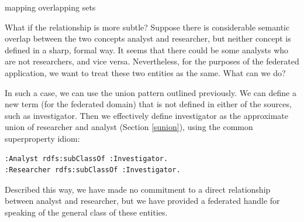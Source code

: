 \begin{challenge}{mapping overlapping sets}
\label{chal:6}

What if the relationship is more subtle? Suppose there is considerable
semantic overlap between the two concepts analyst and researcher, but
neither concept is defined in a sharp, formal way. It seems that there
could be some analysts who are not researchers, and vice versa.
Nevertheless, for the purposes of the federated application, we want to
treat these two entities as the same. What can we do?

\solution

In such a case, we can use the union pattern outlined previously. We can
define a new term (for the federated domain) that is not defined in
either of the sources, such as investigator. Then we effectively define
investigator as the approximate union of researcher and analyst (Section \ref{sunion}), using the common
superproperty idiom:

\begin{lstlisting}
:Analyst rdfs:subClassOf :Investigator.
:Researcher rdfs:subClassOf :Investigator.
\end{lstlisting}

Described this way, we have made no commitment to a direct relationship
between analyst and researcher, but we have provided a federated handle
for speaking of the general class of these entities.
\end{challenge}

